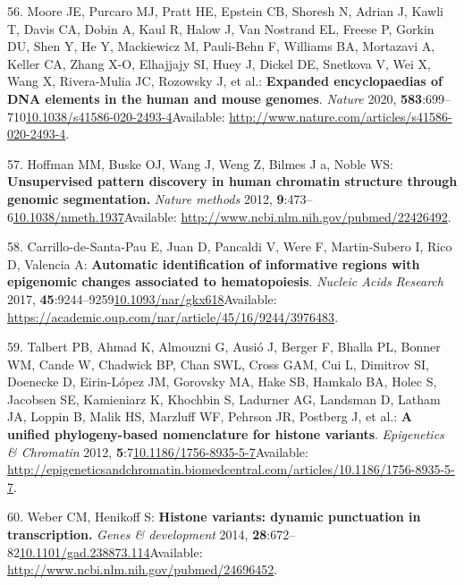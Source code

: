 \documentclass[
]{book}
\begin{document}
\leavevmode\hypertarget{ref-Moore2020}{}%
56. Moore JE, Purcaro MJ, Pratt HE, Epstein CB, Shoresh N, Adrian J, Kawli T, Davis CA, Dobin A, Kaul R, Halow J, Van Nostrand EL, Freese P, Gorkin DU, Shen Y, He Y, Mackiewicz M, Pauli-Behn F, Williams BA, Mortazavi A, Keller CA, Zhang X-O, Elhajjajy SI, Huey J, Dickel DE, Snetkova V, Wei X, Wang X, Rivera-Mulia JC, Rozowsky J, et al.: \textbf{Expanded encyclopaedias of DNA elements in the human and mouse genomes}. \emph{Nature} 2020, \textbf{583}:699--710\href{https://doi.org/10.1038/s41586-020-2493-4}{10.1038/s41586-020-2493-4}Available: \url{http://www.nature.com/articles/s41586-020-2493-4}.

\leavevmode\hypertarget{ref-Hoffman2012}{}%
57. Hoffman MM, Buske OJ, Wang J, Weng Z, Bilmes J a, Noble WS: \textbf{Unsupervised pattern discovery in human chromatin structure through genomic segmentation.} \emph{Nature methods} 2012, \textbf{9}:473--6\href{https://doi.org/10.1038/nmeth.1937}{10.1038/nmeth.1937}Available: \url{http://www.ncbi.nlm.nih.gov/pubmed/22426492}.

\leavevmode\hypertarget{ref-Carrillo-de-Santa-Pau2017}{}%
58. Carrillo-de-Santa-Pau E, Juan D, Pancaldi V, Were F, Martin-Subero I, Rico D, Valencia A: \textbf{Automatic identification of informative regions with epigenomic changes associated to hematopoiesis}. \emph{Nucleic Acids Research} 2017, \textbf{45}:9244--9259\href{https://doi.org/10.1093/nar/gkx618}{10.1093/nar/gkx618}Available: \url{https://academic.oup.com/nar/article/45/16/9244/3976483}.

\leavevmode\hypertarget{ref-Talbert2012}{}%
59. Talbert PB, Ahmad K, Almouzni G, Ausió J, Berger F, Bhalla PL, Bonner WM, Cande W, Chadwick BP, Chan SWL, Cross GAM, Cui L, Dimitrov SI, Doenecke D, Eirin-López JM, Gorovsky MA, Hake SB, Hamkalo BA, Holec S, Jacobsen SE, Kamieniarz K, Khochbin S, Ladurner AG, Landsman D, Latham JA, Loppin B, Malik HS, Marzluff WF, Pehrson JR, Postberg J, et al.: \textbf{A unified phylogeny-based nomenclature for histone variants}. \emph{Epigenetics \& Chromatin} 2012, \textbf{5}:7\href{https://doi.org/10.1186/1756-8935-5-7}{10.1186/1756-8935-5-7}Available: \url{http://epigeneticsandchromatin.biomedcentral.com/articles/10.1186/1756-8935-5-7}.

\leavevmode\hypertarget{ref-Weber2014}{}%
60. Weber CM, Henikoff S: \textbf{Histone variants: dynamic punctuation in transcription.} \emph{Genes \& development} 2014, \textbf{28}:672--82\href{https://doi.org/10.1101/gad.238873.114}{10.1101/gad.238873.114}Available: \url{http://www.ncbi.nlm.nih.gov/pubmed/24696452}.
\end{document}

